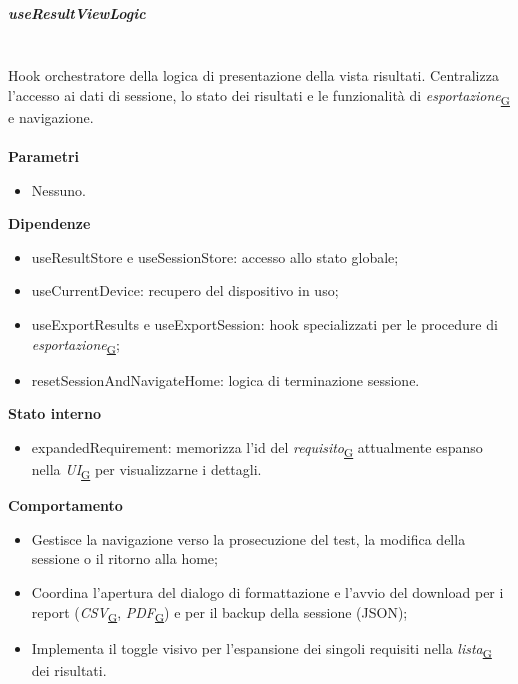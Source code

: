 \documentclass[a4paper,12pt]{article}
\begin{document}
                \subparagraph{useResultViewLogic}\mbox{}\\
                Hook orchestratore della logica di presentazione della vista risultati. Centralizza l'accesso ai dati di sessione, lo stato dei risultati e le funzionalità di \textit{esportazione}\textsubscript{\href{https://atlasteam9.github.io/Atlas/glossario.html\#Esportazione}{G}} e navigazione.\\\\
                \textbf{Parametri}
                \begin{itemize}
                    \item Nessuno.
                \end{itemize}
                \textbf{Dipendenze}
                \begin{itemize}
                    \item {\ttfamily useResultStore} e {\ttfamily useSessionStore}: accesso allo stato globale;
                    \item {\ttfamily useCurrentDevice}: recupero del dispositivo in uso;
                    \item {\ttfamily useExportResults} e {\ttfamily useExportSession}: hook specializzati per le procedure di \textit{esportazione}\textsubscript{\href{https://atlasteam9.github.io/Atlas/glossario.html\#Esportazione}{G}};
                    \item {\ttfamily resetSessionAndNavigateHome}: logica di terminazione sessione.
                \end{itemize}
                \textbf{Stato interno}
                \begin{itemize}
                    \item {\ttfamily expandedRequirement}: memorizza l'id del \textit{requisito}\textsubscript{\href{https://atlasteam9.github.io/Atlas/glossario.html\#Requisito}{G}} attualmente espanso nella \textit{UI}\textsubscript{\href{https://atlasteam9.github.io/Atlas/glossario.html\#UI}{G}} per visualizzarne i dettagli.
                \end{itemize}
                \textbf{Comportamento}
                \begin{itemize}
                    \item Gestisce la navigazione verso la prosecuzione del test, la modifica della sessione o il ritorno alla home;
                    \item Coordina l'apertura del dialogo di formattazione e l'avvio del download per i report (\textit{CSV}\textsubscript{\href{https://atlasteam9.github.io/Atlas/glossario.html\#CSV}{G}}, \textit{PDF}\textsubscript{\href{https://atlasteam9.github.io/Atlas/glossario.html\#PDF}{G}}) e per il backup della sessione (JSON);
                    \item Implementa il toggle visivo per l'espansione dei singoli requisiti nella \textit{lista}\textsubscript{\href{https://atlasteam9.github.io/Atlas/glossario.html\#Lista}{G}} dei risultati.
                \end{itemize}
\end{document}
